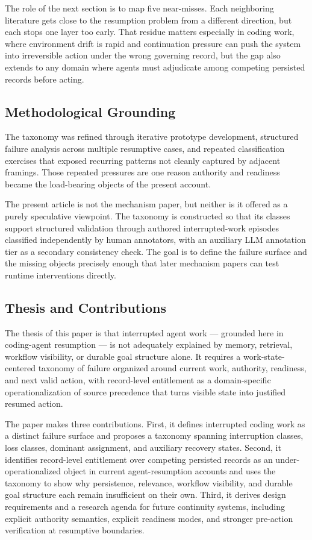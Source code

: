 \documentclass[a4paper,fleqn]{cas-dc}
\begin{document}
The role of the next section is to map five near-misses. Each neighboring literature gets close to the resumption problem from a different direction, but each stops one layer too early. That residue matters especially in coding work, where environment drift is rapid and continuation pressure can push the system into irreversible action under the wrong governing record, but the gap also extends to any domain where agents must adjudicate among competing persisted records before acting.

\subsection{Methodological Grounding}

The taxonomy was refined through iterative prototype development, structured failure analysis across multiple resumptive cases, and repeated classification exercises that exposed recurring patterns not cleanly captured by adjacent framings. Those repeated pressures are one reason authority and readiness became the load-bearing objects of the present account.

The present article is not the mechanism paper, but neither is it offered as a purely speculative viewpoint. The taxonomy is constructed so that its classes support structured validation through authored interrupted-work episodes classified independently by human annotators, with an auxiliary LLM annotation tier as a secondary consistency check. The goal is to define the failure surface and the missing objects precisely enough that later mechanism papers can test runtime interventions directly.

\subsection{Thesis and Contributions}

The thesis of this paper is that interrupted agent work --- grounded here in coding-agent resumption --- is not adequately explained by memory, retrieval, workflow visibility, or durable goal structure alone. It requires a work-state-centered taxonomy of failure organized around current work, authority, readiness, and next valid action, with record-level entitlement as a domain-specific operationalization of source precedence that turns visible state into justified resumed action.

The paper makes three contributions. First, it defines interrupted coding work as a distinct failure surface and proposes a taxonomy spanning interruption classes, loss classes, dominant assignment, and auxiliary recovery states. Second, it identifies record-level entitlement over competing persisted records as an under-operationalized object in current agent-resumption accounts and uses the taxonomy to show why persistence, relevance, workflow visibility, and durable goal structure each remain insufficient on their own. Third, it derives design requirements and a research agenda for future continuity systems, including explicit authority semantics, explicit readiness modes, and stronger pre-action verification at resumptive boundaries.
\end{document}
